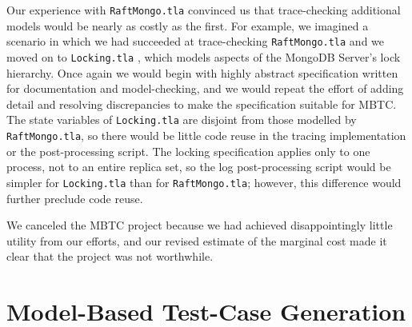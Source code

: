\documentclass{vldb}
\begin{document}
Our experience with \texttt{RaftMongo.tla} convinced us that trace-checking additional models would be nearly as costly as the first.
For example, we imagined a scenario in which we had succeeded at trace-checking \texttt{RaftMongo.tla} and we moved on to \texttt{Locking.tla} \cite{LockingTLA}, which models aspects of the MongoDB Server's lock hierarchy.
Once again we would begin with highly abstract specification written for documentation and model-checking, and we would repeat the effort of adding detail and resolving discrepancies to make the specification suitable for MBTC.
The state variables of \texttt{Locking.tla} are disjoint from those modelled by \texttt{RaftMongo.tla}, so there would be little code reuse in the tracing implementation or the post-processing script.
The locking specification applies only to one process, not to an entire replica set, so the log post-processing script would be simpler for \texttt{Locking.tla} than for \texttt{RaftMongo.tla}; however, this difference would further preclude code reuse.

We canceled the MBTC project because we had achieved disappointingly little utility from our efforts, and our revised estimate of the marginal cost made it clear that the project was not worthwhile.




\section{Model-Based Test-Case Generation}
\label{sec:model_based_test_case_generation}
\end{document}
